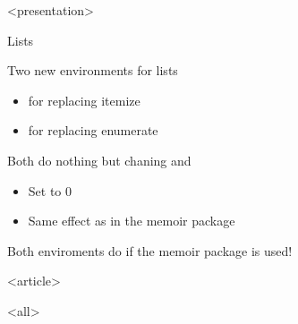 \mode
<presentation>

\begin{frame}{Lists}
  \label{manual:lists}

  Two new environments for lists
  \begin{itemize}
    \item \cmd{\skbnotelist} for replacing itemize
    \item \cmd{\skbnoteenum} for replacing enumerate
  \end{itemize}

  Both do nothing but chaning  and 
  \begin{itemize}
    \item Set to 0
    \item Same effect as \cmd{\tightlist} in the memoir package
  \end{itemize}

  \bigskip

  Both enviroments do  if the memoir package is used!

\end{frame}


\mode
<article>

\bigskip


\clearpage

\mode
<all>
